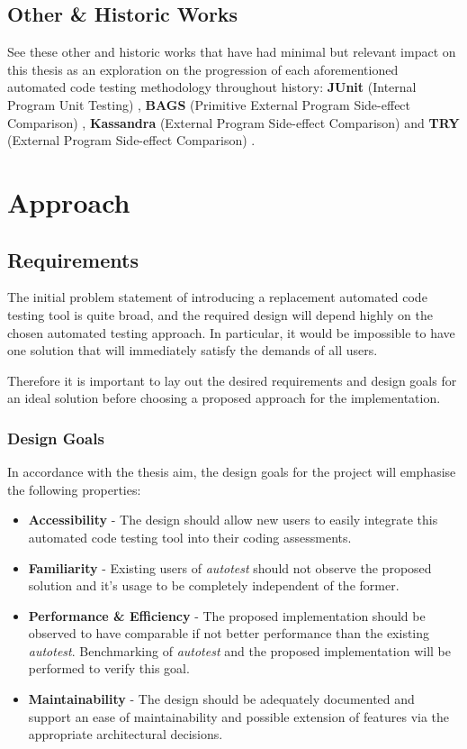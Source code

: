 \documentclass[hidelinks]{report}
\newcommand{\unchapter}[2]{
    \setcounter{chapter}{#1}
    \setcounter{section}{0}
    \chapter*{#2}
    \addcontentsline{toc}{chapter}{#2}
}
\begin{document}
\section{Other \& Historic Works}
See these other and historic works that have had minimal but relevant impact on this thesis as an exploration on the progression of each aforementioned automated code testing methodology throughout history: \textbf{JUnit} (Internal Program Unit Testing) \cite{junit}, \textbf{BAGS} (Primitive External Program Side-effect Comparison) \cite{bags}, \textbf{Kassandra} (External Program Side-effect Comparison) \cite{kassandra} and \textbf{TRY} (External Program Side-effect Comparison) \cite{try}. 

\unchapter{4}{Approach}

\section{Requirements}

The initial problem statement of introducing a replacement automated code testing tool is quite broad, and the required design will depend highly on the chosen automated testing approach. In particular, it would be impossible to have one solution that will immediately satisfy the demands of all users.

Therefore it is important to lay out the desired requirements and design goals for an ideal solution before choosing a proposed approach for the implementation.

\subsection{Design Goals}

In accordance with the thesis aim, the design goals for the project will emphasise the following properties:

\begin{itemize}
	\item \textbf{Accessibility} - The design should allow new users to easily integrate this automated code testing tool into their coding assessments.
	\item \textbf{Familiarity} - Existing users of \textit{autotest} should not observe the proposed solution and it's usage to be completely independent of the former.
	\item \textbf{Performance \& Efficiency} - The proposed implementation should be observed to have comparable if not better performance than the existing \textit{autotest}. Benchmarking of \textit{autotest} and the proposed implementation will be performed to verify this goal.
	\item \textbf{Maintainability} - The design should be adequately documented and support an ease of maintainability and possible extension of features via the appropriate architectural decisions.
\end{itemize}
\end{document}
